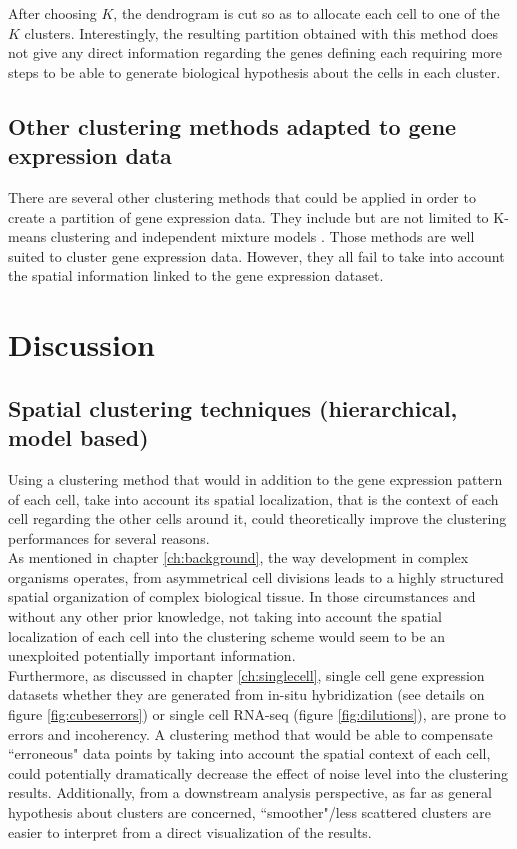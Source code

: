 	After choosing $K$, the dendrogram is cut so as to allocate each cell to one of the $K$ clusters. Interestingly, the resulting partition obtained with this method does not give any direct information regarding the genes defining each requiring more steps to be able to generate biological hypothesis about the cells in each cluster.

 
	\subsection{Other clustering methods adapted to gene expression data}
	There are several other clustering methods that could be applied in order to create a partition of gene expression data. They include but are not limited to K-means clustering  and independent mixture models \cite{dempster77}. Those methods are well suited to cluster gene expression data. However, they all fail to take into account the spatial information linked to the gene expression dataset.


\section{Discussion}
	\subsection{Spatial clustering techniques (hierarchical, model based)}
	Using a clustering method that would in addition to the gene expression pattern of each cell, take into account its spatial localization, that is the context of each cell regarding the other cells around it, could theoretically improve the clustering performances for several reasons.\\
	
	As mentioned in chapter \ref{ch:background}, the way development in complex organisms operates, from asymmetrical cell divisions leads to a highly structured spatial organization of complex biological tissue. In those circumstances and without any other prior knowledge, not taking into account the spatial localization of each cell into the clustering scheme would seem to be an unexploited potentially important information. \\
	
	Furthermore, as discussed in chapter \ref{ch:singlecell}, single cell gene expression datasets whether they are generated from in-situ hybridization (see details on figure \ref{fig:cubeserrors}) or single cell RNA-seq (figure \ref{fig:dilutions}), are prone to errors and incoherency. A clustering method that would be able to compensate ``erroneous" data points by taking into account the spatial context of each cell, could potentially dramatically decrease the effect of noise level into the clustering results. Additionally, from a downstream analysis perspective, as far as general hypothesis about clusters are concerned, ``smoother"/less scattered clusters are easier to interpret from a direct visualization of the results.\\
	

